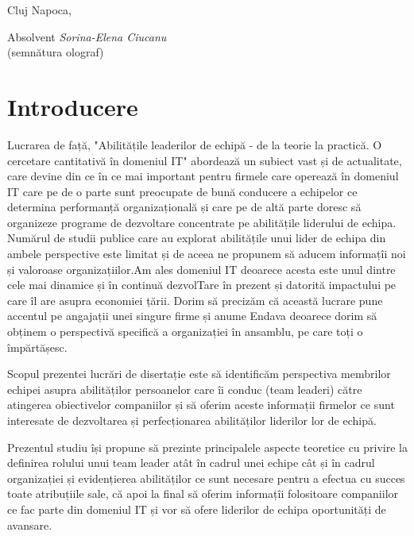 \documentclass[a4paper, 12pt]{article}
\begin{document}
\vspace{3 cm}
\begin{flushleft}
	\large Cluj Napoca,
\end{flushleft}


\begin{flushright}
	\hfill \large Absolvent \textit{Sorina-Elena Ciucanu} \\
	\hfill \large {(semnătura olograf)}
\end{flushright}
\newpage
\thispagestyle{empty}
\tableofcontents
\thispagestyle{empty}
\newpage
\thispagestyle{empty}
\listoffigures
\newpage
\thispagestyle{empty}


\newpage


	\section*{Introducere}
	\quad\quad  Lucrarea de față, "Abilitățile leaderilor de echipă - de la teorie la practică. O cercetare cantitativă în domeniul IT" abordează un subiect vast și de actualitate, care devine din ce în ce mai important pentru firmele care operează în domeniul IT care pe de o parte sunt preocupate de bună conducere a echipelor ce determina performanță organizațională și care pe de altă parte doresc să organizeze programe de dezvoltare concentrate pe abilitățile liderului de echipa. Numărul de studii publice care au explorat abilitățile unui lider de echipa din ambele perspective este limitat și de aceea ne propunem să aducem informațîi noi și valoroase organizațiilor.Am ales domeniul IT deoarece acesta este unul dintre cele mai dinamice și în continuă dezvolTare în prezent și datorită impactului pe care îl are asupra economiei țării. Dorim să precizăm că această lucrare pune accentul pe angajații unei singure firme și anume Endava deoarece dorim să obținem o perspectivă specifică a organizației în ansamblu, pe care toți o împărtășesc.

	\quad  Scopul prezentei lucrări de disertație este să identificăm perspectiva membrilor echipei asupra abilităților persoanelor care îi conduc (team leaderi) către atingerea obiectivelor companiilor și să oferim aceste informații firmelor ce sunt interesate de dezvoltarea și perfecționarea abilităților liderilor lor de echipă.

	\quad Prezentul studiu își propune să prezinte principalele aspecte teoretice cu privire la definirea rolului unui team leader atât în cadrul unei echipe cât și în cadrul organizației și evidențierea abilităților ce sunt necesare pentru a efectua cu succes toate atribuțiile sale, că apoi la final să oferim informațîi folositoare companiilor ce fac parte din domeniul IT și vor să ofere liderilor de echipa oportunități de avansare.
\end{document}
